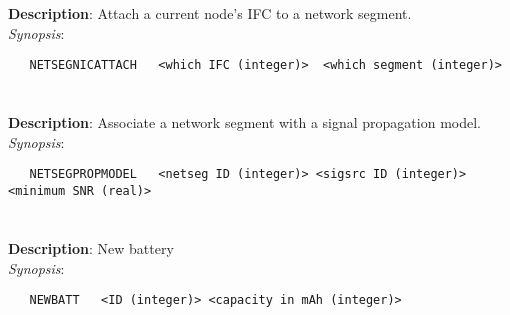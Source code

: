 \section{\quad{}}
\label{manpages:NETSEGNICATTACH}
\label{manpages:netsegnicattach}
\vspace{-0.1in}
{\bf Description}: 	Attach a current node's IFC to a network segment.\\[1.5ex]
{\em Synopsis}:
\vspace{-0.05in}
\scriptsize
\begin{lstlisting}
   NETSEGNICATTACH   <which IFC (integer)>	<which segment (integer)>													
\end{lstlisting}
\normalsize
\vspace{-0.05in}


\section{\quad{}}
\label{manpages:NETSEGPROPMODEL}
\label{manpages:netsegpropmodel}
\vspace{-0.1in}
{\bf Description}: 	Associate a network segment with a signal propagation model.\\[1.5ex]
{\em Synopsis}:
\vspace{-0.05in}
\scriptsize
\begin{lstlisting}
   NETSEGPROPMODEL   <netseg ID (integer)> <sigsrc ID (integer)> <minimum SNR (real)>										
\end{lstlisting}
\normalsize
\vspace{-0.05in}


\section{\quad{}}
\label{manpages:NEWBATT}
\label{manpages:newbatt}
\vspace{-0.1in}
{\bf Description}: 	New battery\\[1.5ex]
{\em Synopsis}:
\vspace{-0.05in}
\scriptsize
\begin{lstlisting}
   NEWBATT   <ID (integer)> <capacity in mAh (integer)>								
\end{lstlisting}
\normalsize
\vspace{-0.05in}


